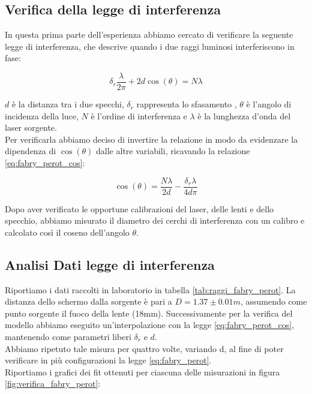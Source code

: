 \documentclass[letterpaper,12pt]{article}
\begin{document}
\subsection{Verifica della legge di interferenza}

In questa prima parte dell'esperienza abbiamo cercato di verificare
la seguente legge di interferenza, che descrive quando i due raggi luminosi interferiscono in fase:

\begin{equation}
    \delta_r \frac{\lambda}{2 \pi} + 2d \cos(\theta) = N \lambda
    \label{eq:fabry_perot}
\end{equation}

$d$ è la distanza tra i due specchi, $\delta_r$ rappresenta lo sfasamento , $\theta$ è l'angolo di incidenza della luce, $N$ è l'ordine di interferenza e $\lambda$ 
è la lunghezza d'onda del laser sorgente. \\
Per verificarla abbiamo deciso di invertire la relazione in modo da evidenzare la dipendenza di $\cos(\theta)$ dalle
altre variabili, ricavando la relazione \ref{eq:fabry_perot_cos}:

\begin{equation}
    \cos(\theta) = \frac{N \lambda}{2d} - \frac{\delta_r \lambda}{4 d \pi}
    \label{eq:fabry_perot_cos}
\end{equation}

Dopo aver verificato le opportune calibrazioni del laser, delle lenti e dello specchio,
abbiamo misurato il diametro dei cerchi di interferenza con un calibro e calcolato così il coseno dell'angolo $\theta$.\\

\subsection{Analisi Dati legge di interferenza}
Riportiamo i dati raccolti in laboratorio in tabella \ref{tab:raggi_fabry_perot}.
La distanza dello schermo dalla sorgente è pari a $D = 1.37 \pm0.01 m$, assumendo come punto sorgente il fuoco della lente 
(18mm). Successivamente per la verifica del modello abbiamo eseguito un'interpolazione con la legge \ref{eq:fabry_perot_cos}, mantenendo come 
parametri liberi $\delta_r$ e $d$.\\
Abbiamo ripetuto tale misura per quattro volte, variando d, al fine di poter verificare in più configurazioni la 
legge \eqref{eq:fabry_perot}.\\
Riportiamo i grafici dei fit ottenuti per ciascuna delle misurazioni in figura \ref{fig:verifica_fabry_perot}:
\end{document}
